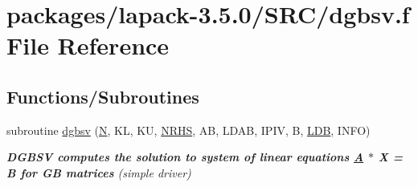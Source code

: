 \hypertarget{dgbsv_8f}{}\section{packages/lapack-\/3.5.0/\+S\+R\+C/dgbsv.f File Reference}
\label{dgbsv_8f}
\subsection*{Functions/\+Subroutines}
\begin{DoxyCompactItemize}
\item 
subroutine \hyperlink{group__doubleGBsolve_gafa35ce1d7865b80563bbed6317050ad7}{dgbsv} (\hyperlink{polmisc_8c_a0240ac851181b84ac374872dc5434ee4}{N}, K\+L, K\+U, \hyperlink{example__user_8c_aa0138da002ce2a90360df2f521eb3198}{N\+R\+H\+S}, A\+B, L\+D\+A\+B, I\+P\+I\+V, B, \hyperlink{example__user_8c_a50e90a7104df172b5a89a06c47fcca04}{L\+D\+B}, I\+N\+F\+O)
\begin{DoxyCompactList}\small\item\em {\bfseries  D\+G\+B\+S\+V computes the solution to system of linear equations \hyperlink{classA}{A} $\ast$ X = B for G\+B matrices} (simple driver) \end{DoxyCompactList}\end{DoxyCompactItemize}
